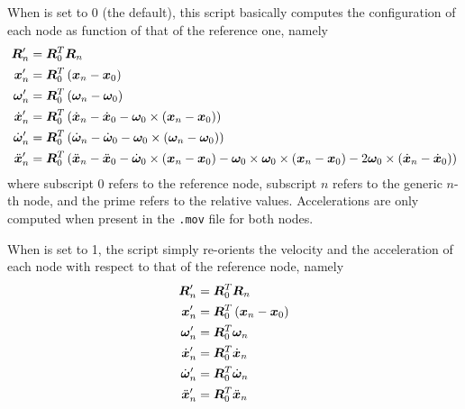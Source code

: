 When  is set to 0 (the default),
this script basically computes the configuration of each node
as function of that of the reference one, namely
\begin{align}
	\boldsymbol{R}_n' &= \boldsymbol{R}_0^T \boldsymbol{R}_n \\
	\boldsymbol{x}_n' &= \boldsymbol{R}_0^T\left( \boldsymbol{x}_n - \boldsymbol{x}_0 \right) \\
	\boldsymbol{\omega}_n' &= \boldsymbol{R}_0^T\left( \boldsymbol{\omega}_n - \boldsymbol{\omega}_0 \right) \\
	\dot{\boldsymbol{x}}_n' &= \boldsymbol{R}_0^T\left( \dot{\boldsymbol{x}}_n - \dot{\boldsymbol{x}}_0 - \boldsymbol{\omega}_0\times\left( \boldsymbol{x}_n - \boldsymbol{x}_0 \right) \right) \\
	\dot{\boldsymbol{\omega}}_n' &= \boldsymbol{R}_0^T\left( 
		\dot{\boldsymbol{\omega}}_n - \dot{\boldsymbol{\omega}}_0 - \boldsymbol{\omega}_0\times\left( \boldsymbol{\omega}_n - \boldsymbol{\omega}_0 \right)
	 \right) \\
	\ddot{\boldsymbol{x}}_n' &= \boldsymbol{R}_0^T\left( 
		\ddot{\boldsymbol{x}}_n - \ddot{\boldsymbol{x}}_0
		- \dot{\boldsymbol{\omega}}_0\times\left( \boldsymbol{x}_n - \boldsymbol{x}_0 \right)
		- \boldsymbol{\omega}_0\times\boldsymbol{\omega}_0\times\left( \boldsymbol{x}_n - \boldsymbol{x}_0 \right)
		- 2 \boldsymbol{\omega}_0\times\left( \dot{\boldsymbol{x}}_n - \dot{\boldsymbol{x}}_0 \right)
	 \right)
\end{align}
where subscript $0$ refers to the reference node,
subscript $n$ refers to the generic $n$-th node,
and the prime refers to the relative values.
Accelerations are only computed when present in the \texttt{.mov} file
for both nodes.

When  is set to 1, the script simply re-orients
the velocity and the acceleration of each node with respect
to that of the reference node, namely
\begin{align}
	\boldsymbol{R}_n' &= \boldsymbol{R}_0^T \boldsymbol{R}_n \\
	\boldsymbol{x}_n' &= \boldsymbol{R}_0^T\left( \boldsymbol{x}_n - \boldsymbol{x}_0 \right) \\
	\boldsymbol{\omega}_n' &= \boldsymbol{R}_0^T \boldsymbol{\omega}_n \\
	\dot{\boldsymbol{x}}_n' &= \boldsymbol{R}_0^T \dot{\boldsymbol{x}}_n \\
	\dot{\boldsymbol{\omega}}_n' &= \boldsymbol{R}_0^T \dot{\boldsymbol{\omega}}_n \\
	\ddot{\boldsymbol{x}}_n' &= \boldsymbol{R}_0^T \ddot{\boldsymbol{x}}_n
\end{align}

